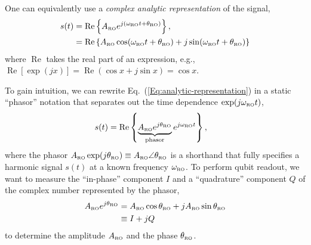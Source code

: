 \documentclass[aip,apr,twocolumn,showpacs,superscriptaddress,groupedaddress,nofootinbib,reprint]{revtex4-1}  %
\begin{document}
%
One can equivalently use a \textit{complex analytic representation} of the signal,
\begin{align}\label{Eq:analytic-representation}
s(t) &= \operatorname{Re} \left\{ A_{\mbox{\tiny{RO}}} e^{j (\omega_{\mbox{\tiny{RO}}} t + \theta_{\mbox{\tiny{RO}}})} \right\}, \\
     &= \operatorname{Re} \left\{ A_{\mbox{\tiny{RO}}} \cos(\omega_{\mbox{\tiny{RO}}} t + \theta_{\mbox{\tiny{RO}}})
                                + j \sin (\omega_{\mbox{\tiny{RO}}} t + \theta_{\mbox{\tiny{RO}}}) \right\} \nonumber %
\end{align}
%
where $\operatorname{Re}$ takes the real part of an expression, e.g., $\operatorname{Re} [\exp(jx)] = \operatorname{Re} (\cos x + j\sin x) = \cos x$.

To gain intuition, we can rewrite Eq.~(\ref{Eq:analytic-representation}) in a static ``phasor'' notation that separates out the time dependence $\exp(j \omega_{\mbox{\tiny{RO}}} t)$,
%
\begin{align}\label{Eq:phasor}
 s(t) &= \operatorname{Re} \left\{ \underbrace{A_{\mbox{\tiny{RO}}} e^{j \theta_{\mbox{\tiny{RO}}}}}_{\mathrm{phasor}} e^{j \omega_{\mbox{\tiny{RO}}} t}  \right\},
\end{align}
%
where the phasor $A_{\mbox{\tiny{RO}}} \exp(j \theta_{\mbox{\tiny{RO}}}) \equiv A_{\mbox{\tiny{RO}}} \angle \theta_{\mbox{\tiny{RO}}}$ is a shorthand that fully specifies a harmonic signal $s(t)$ at a known frequency $\omega_{\mbox{\tiny{RO}}}$.
To perform qubit readout, we want to measure the ``in-phase'' component $I$ and a ``quadrature'' component $Q$ of the complex number represented by the phasor,
\begin{align}
    A_{\mbox{\tiny{RO}}} e^{j \theta_{\mbox{\tiny{RO}}}} &=
    A_{\mbox{\tiny{RO}}} \cos \theta_{\mbox{\tiny{RO}}} + j  A_{\mbox{\tiny{RO}}} \sin \theta_{\mbox{\tiny{RO}}} \\
    &\equiv I + j Q
\end{align}
to determine the amplitude $A_{\mbox{\tiny{RO}}}$ and the phase $\theta_{\mbox{\tiny{RO}}}$.
\end{document}
